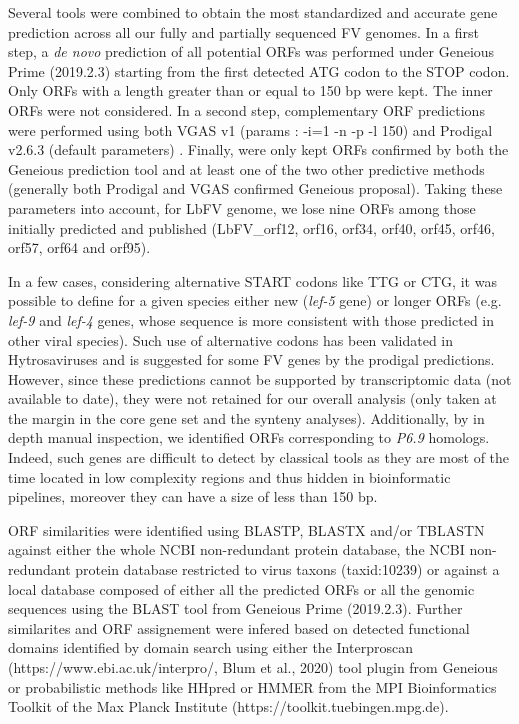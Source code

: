 Several tools were combined to obtain the most standardized and accurate gene prediction across all our fully and partially sequenced FV genomes. In a first step, a \textit{de novo} prediction of all potential ORFs was performed under Geneious Prime (2019.2.3) \citep{kearse_geneious_2012} starting from the first detected ATG codon to the STOP codon. Only ORFs with a length greater than or equal to 150 bp were kept. The inner ORFs were not considered. In a second step, complementary ORF predictions were performed using both VGAS v1 (params : -i=1 -n -p -l 150) \citep{zhang_vgas_2019} and Prodigal v2.6.3 (default parameters) \citep{hyatt_prodigal_2010}. Finally, were only kept ORFs confirmed by both the Geneious prediction tool and at least one of the two other predictive methods (generally both Prodigal and VGAS confirmed Geneious proposal). Taking these parameters into account, for LbFV genome, we lose nine ORFs among those initially predicted and published (LbFV\_orf12, orf16, orf34, orf40, orf45, orf46, orf57, orf64 and orf95). 

In a few cases, considering alternative START codons like TTG or CTG, it was possible to define for a given species either new (\textit{lef-5} gene) or longer ORFs (e.g. \textit{lef-9} and \textit{lef-4} genes, whose sequence is more consistent with those predicted in other viral species). Such use of alternative codons has been validated in Hytrosaviruses \citep{abd-alla_comprehensive_2016} and is suggested for some FV genes by the prodigal predictions. However, since these predictions cannot be supported by transcriptomic data (not available to date), they were not retained for our overall analysis (only taken at the margin in the core gene set and the synteny analyses). Additionally, by in depth manual inspection, we identified ORFs corresponding to \textit{P6.9} homologs. Indeed, such genes are difficult to detect by classical tools as they are most of the time located in low complexity regions and thus hidden in bioinformatic pipelines, moreover they can have a size of less than 150 bp. 

ORF similarities were identified using BLASTP, BLASTX and/or TBLASTN \citep{altschul_gapped_1997,altschul_protein_2005}  against either the whole NCBI non-redundant protein database, the NCBI non-redundant protein database restricted to virus taxons (taxid:10239) or against a local database composed of either all the predicted ORFs or all the genomic sequences using the BLAST tool from Geneious Prime (2019.2.3). Further similarites and ORF assignement were infered based on detected functional domains identified by domain search using either the Interproscan (https://www.ebi.ac.uk/interpro/, Blum et al., 2020) tool plugin from Geneious or probabilistic methods like HHpred or HMMER from the MPI Bioinformatics Toolkit of the Max Planck Institute (https://toolkit.tuebingen.mpg.de).  


